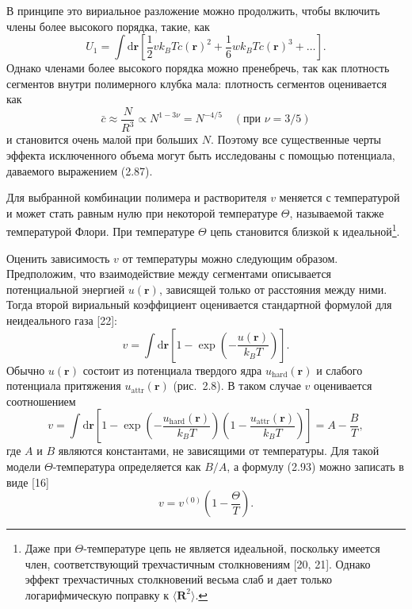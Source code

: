 \documentclass[12pt,a4paper]{article}
\begin{document}
В принципе это вириальное разложение можно продолжить, чтобы включить члены более высокого порядка, такие, как
\begin{equation}
U_1 = \int\!\mathrm{d}\boldsymbol{r}\left[\frac{1}{2}v k_B T c(\boldsymbol{r})^2 + \frac{1}{6}w k_B T c(\boldsymbol{r})^3 + \dots\right]. \tag{2.90}
\end{equation}
Однако членами более высокого порядка можно пренебречь, так как плотность сегментов внутри полимерного клубка мала: плотность сегментов оценивается как
\begin{equation}
\bar{c} \approx \frac{N}{R^3} \propto N^{1 - 3\nu} = N^{-4/5} \quad (\text{при } \nu = 3/5) \tag{2.91}
\end{equation}
и становится очень малой при больших $N$. Поэтому все существенные черты эффекта исключенного объема могут быть исследованы с помощью потенциала, даваемого выражением (2.87).

Для выбранной комбинации полимера и растворителя $v$ меняется с температурой и может стать равным нулю при некоторой температуре $\Theta$, называемой также температурой Флори. При температуре $\Theta$ цепь становится близкой к идеальной\footnote{Даже при $\Theta$-температуре цепь не является идеальной, поскольку имеется член, соответствующий трехчастичным столкновениям [20, 21]. Однако эффект трехчастичных столкновений весьма слаб и дает только логарифмическую поправку к $\langle\boldsymbol{R}^2\rangle$.}.

Оценить зависимость $v$ от температуры можно следующим образом. Предположим, что взаимодействие между сегментами описывается потенциальной энергией $u(\boldsymbol{r})$, зависящей только от расстояния между ними. Тогда второй вириальный коэффициент оценивается стандартной формулой для неидеального газа [22]:
\begin{equation}
v = \int\!\mathrm{d}\boldsymbol{r}\left[1 - \exp\left(-\frac{u(\boldsymbol{r})}{k_B T}\right)\right]. \tag{2.92}
\end{equation}
Обычно $u(\boldsymbol{r})$ состоит из потенциала твердого ядра $u_{\mathrm{hard}}(\boldsymbol{r})$ и слабого потенциала притяжения $u_{\mathrm{attr}}(\boldsymbol{r})$ (рис.~2.8). В таком случае $v$ оценивается соотношением
\begin{equation}
v = \int\!\mathrm{d}\boldsymbol{r}\left[1 - \exp\left(-\frac{u_{\mathrm{hard}}(\boldsymbol{r})}{k_B T}\right)\left(1 - \frac{u_{\mathrm{attr}}(\boldsymbol{r})}{k_B T}\right)\right] = A - \frac{B}{T}, \tag{2.93}
\end{equation}
где $A$ и $B$ являются константами, не зависящими от температуры. Для такой модели $\Theta$-температура определяется как $B/A$, а формулу (2.93) можно записать в виде [16]
\begin{equation}
v = v^{(0)}\left(1 - \frac{\Theta}{T}\right). \tag{2.94}
\end{equation}
\end{document}
